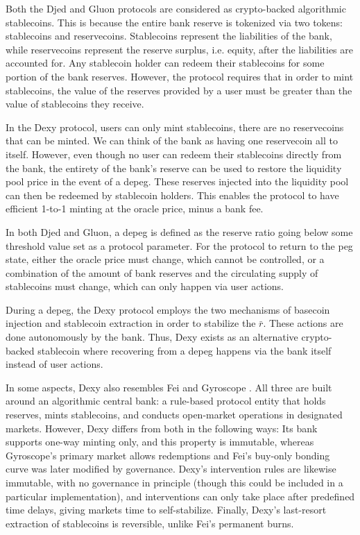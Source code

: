 \documentclass{ifcolog}
\newcommand{\rr}{\bar{r}}
\newcommand{\dx}{Dexy}
\begin{document}
Both the Djed \cite{DjedEprint} and Gluon \cite{Gluon} protocols are considered as crypto-backed algorithmic stablecoins.
This is because the entire bank reserve is tokenized via two tokens: stablecoins and reservecoins.
Stablecoins represent the liabilities of the bank, while reservecoins represent the reserve surplus, 
i.e. equity, after the liabilities are accounted for. Any stablecoin holder can redeem their stablecoins for some 
portion of the bank reserves. However, the protocol requires that in order to mint stablecoins, 
the value of the reserves provided by a user must be 
greater than the value of stablecoins they receive.

In the Dexy protocol, users can only mint stablecoins, there are no reservecoins that can be minted. 
We can think of the bank as having one reservecoin all to itself. However, even though no user can redeem their 
stablecoins directly from the bank, the entirety of the bank's reserve can be used to restore the liquidity 
pool price in the event of a depeg. These reserves injected into the liquidity pool can then be redeemed by stablecoin holders.
This enables the protocol to have efficient 1-to-1 minting at the oracle price, minus a bank fee. 

In both Djed and Gluon, a depeg is defined as the reserve ratio going below some threshold value set as a protocol parameter. 
For the protocol to return to the peg state, either the oracle price must change, which cannot be controlled, or 
a combination of the amount of bank reserves and the circulating supply of stablecoins must change, which can only happen via user 
actions.

During a depeg, the Dexy protocol employs the two mechanisms of basecoin injection and stablecoin extraction in order 
to stabilize the $\rr$. These actions are done autonomously by the bank. Thus, Dexy exists as an alternative 
crypto-backed stablecoin where recovering from a depeg happens via the bank itself instead of user actions.

In some aspects, \dx{} also resembles Fei \cite{Fei} and Gyroscope \cite{Gyroscope}.
All three are built around an algorithmic central bank: a rule-based protocol entity that
holds reserves, mints stablecoins, and conducts open-market operations in designated markets.
However, \dx{} differs from both in the following ways: 
Its bank supports one-way minting only, and this property is immutable, whereas Gyroscope's
primary market allows redemptions and Fei's buy-only bonding curve was later modified by governance.
\dx{}'s intervention rules are likewise immutable, with no governance in principle 
(though this could be included in a particular implementation), and interventions can only
take place after predefined time delays, giving markets time to self-stabilize.
Finally, \dx{}'s last-resort extraction of stablecoins is reversible, unlike Fei's permanent burns.
\end{document}
